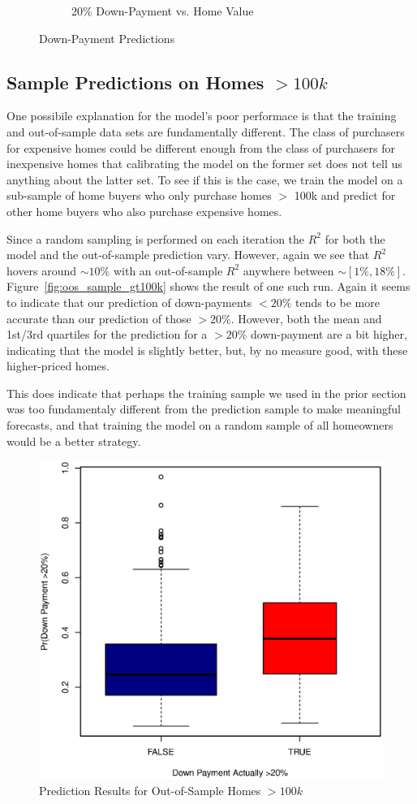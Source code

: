 \documentclass[11pt, fleqn]{article}
\begin{document}
\begin{figure}
\begin{subfigure}[b]{0.49\textwidth}
    \caption{$20\%$ Down-Payment vs. Home Value}
    \label{fig:value_20dwn}
  \end{subfigure}
  \caption{Down-Payment Predictions}
\end{figure}

\subsection{Sample Predictions on Homes $>100k$}

One possibile explanation for the model's poor performace is that the training and out-of-sample data sets are fundamentally different. The class of purchasers for expensive homes could be different enough from the class of purchasers for inexpensive homes that calibrating the model on the former set does not tell us anything about the latter set. To see if this is the case, we train the model on a sub-sample of home buyers who only purchase homes $>$ 100k and predict for other home buyers who also purchase expensive homes.

Since a random sampling is performed on each iteration the $R^2$ for both the model and the out-of-sample prediction vary.  However, again we see that $R^2$ hovers around $\sim10\%$ with an out-of-sample $R^2$ anywhere between $\sim[1\%,18\%]$.  Figure~\vref{fig:oos_sample_gt100k} shows the result of one such run.  Again it seems to indicate that our prediction of down-payments $<20\%$ tends to be more accurate than our prediction of those $>20\%$.  However, both the mean and 1st/3rd quartiles for the prediction for a $>20\%$ down-payment are a bit higher, indicating that the model is slightly better, but, by no measure good, with these higher-priced homes.

This does indicate that perhaps the training sample we used in the prior section was too fundamentaly different from the prediction sample to make meaningful forecasts, and that training the model on a random sample of all homeowners would be a better strategy.

\begin{figure}[!htb]
  \centering
  \includegraphics[scale=.5]{oos_subsample_100k.eps}
  \caption{Prediction Results for Out-of-Sample Homes $>100k$}
  \label{fig:oos_sample_gt100k}
\end{figure}
\end{document}
